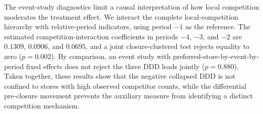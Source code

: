 \documentclass[11 pt]{article}
\begin{document}
The event-study diagnostics limit a causal interpretation of how local competition moderates the treatment effect. We interact the complete local-competition hierarchy with relative-period indicators, using period $-1$ as the reference. The estimated competition-interaction coefficients in periods $-4$, $-3$, and $-2$ are $0.1309$, $0.0906$, and $0.0695$, and a joint closure-clustered test rejects equality to zero ($p=0.002$). By comparison, an event study with preferred-store-by-event-by-period fixed effects does not reject the three DDD leads jointly ($p=0.880$). Taken together, these results show that the negative collapsed DDD is not confined to stores with high observed competitor counts, while the differential pre-closure movement prevents the auxiliary measure from identifying a distinct competition mechanism.
\end{document}
